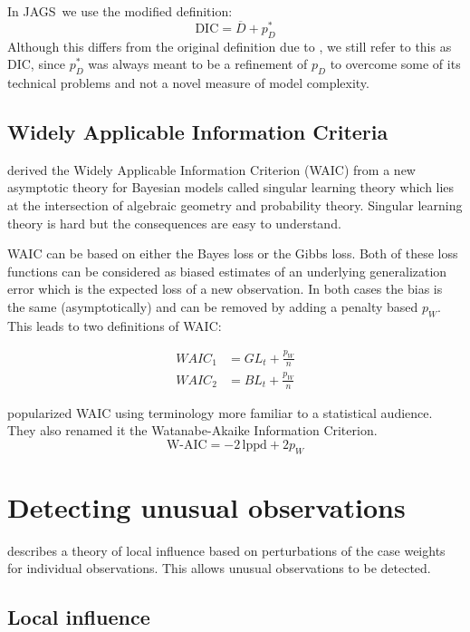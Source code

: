 \documentclass[11pt, a4paper, titlepage]{report}
\newcommand{\JAGS}{\textsf{JAGS}}
\begin{document}
{In \JAGS\ we use the modified definition:
\[
\text{DIC}  = \overline{D} + p^*_D
\]
Although this differs from the original definition due to
\citet{spiegelhalter:etal:2002}, we still refer to this as DIC, since
$p^*_D$ was always meant to be a refinement of $p_D$ to overcome some
of its technical problems and not a novel measure of model complexity.

\subsection{Widely Applicable Information Criteria}

\citet{Watanabe2009Book} derived the Widely Applicable Information
Criterion (WAIC) from a new asymptotic theory for Bayesian models
called singular learning theory which lies at the intersection of
algebraic geometry and probability theory. Singular learning theory is
hard but the consequences are easy to understand.

WAIC can be based on either the Bayes loss or the Gibbs loss. Both of
these loss functions can be considered as biased estimates of an
underlying generalization error which is the expected loss of a new
observation. In both cases the bias is the same (asymptotically) and
can be removed by adding a penalty based $p_W$. This leads to two
definitions of WAIC:

\begin{align*}
WAIC_1 & = GL_t + \frac{p_W}{n}\\
WAIC_2 & = BL_t + \frac{p_W}{n}
\end{align*}

\citet{Gelman2014} popularized WAIC using terminology more
familiar to a statistical audience. They also renamed it the
Watanabe-Akaike Information Criterion.
\[
\text{W-AIC} = - 2 \, \text{lppd} + 2 p_W
\]

\section{Detecting unusual observations}

\citet{Plummer2025} describes a theory of local influence based on 
perturbations of the case weights for individual observations. This
allows unusual observations to be detected.

\subsection{Local influence}

}
\end{document}
